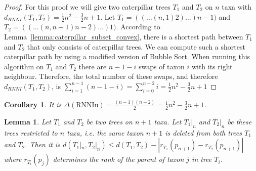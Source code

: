 \documentclass[11pt, a4paper]{article}
\newcommand{\rnniu}{\mathrm{RNNIu}}
\newtheorem{lemma}[definition]{Lemma}
\newtheorem{corollary}[definition]{Corollary}
\begin{document}
\begin{proof}
    For this proof we will give two caterpillar trees $T_1$ and $T_2$ on $n$ taxa with $d_{RNNI}(T_1,T_2) = \frac{1}{2}n^2-\frac{3}{2}n+1$.
	Let $T_1 = (( \dots (n,1)2)\dots)n-1)$ and $T_2 = (( \dots (n,n-1)n-2)\dots)1)$.
    According to Lemma~\ref{lemma:caterpillar_subset_convex}, there is a shortest path between $T_1$ and $T_2$ that only consists of caterpillar trees.
    We can compute such a shortest caterpillar path by using a modified version of Bubble Sort.
    When running this algorithm on $T_1$ and $T_2$ there are $n-1-i$ swaps of taxon $i$ with its right neighbour.
    Therefore, the total number of these swaps, and therefore $d_{RNNI}(T_1,T_2)$, is $\sum\limits_{i=1}^{n-1}(n-1-i) = \sum\limits_{i=0}^{n-2}i = \frac{1}{2}n^2-\frac{3}{2}n+1$
\end{proof}

\begin{corollary}
It is $\Delta(\rnniu) = \frac{(n-1)(n-2)}{2} = \frac{1}{2}n^2-\frac{3}{2}n+1$.
\end{corollary}


\begin{lemma}
    Let $T_1$ and $T_2$ be two trees on $n+1$ taxa.
    Let $T_1|_n$ and $T_2|_n$ be these trees restricted to $n$ taxa, i.e. the same taxon $n+1$ is deleted from both trees $T_1$ and $T_2$.
    Then it is $d(T_1|_n, T_2|_n) \leq d(T_1,T_2) - |r_{T_1}(p_{n+1}) - r_{T_2}(p_{n+1})|$ where $r_{T_i}(p_j)$ determines the rank of the parent of taxon $j$ in tree $T_i$.
    \label{lemma:distance_delete_taxon}
\end{lemma}
\end{document}
